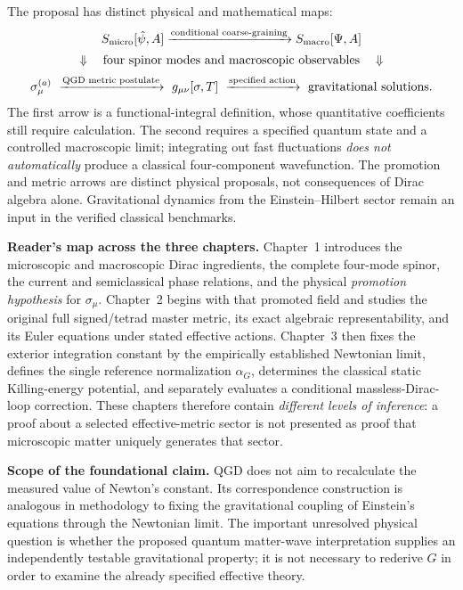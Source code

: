 \documentclass[11pt,a4paper]{article}
\begin{document}
The proposal has distinct physical and mathematical maps:
\begin{equation}\label{eq:three-maps}
\begin{gathered}
 S_{\rm micro}[\hat\psi,A]
 \xrightarrow{\text{conditional coarse-graining}}
 S_{\rm macro}[\Psi,A]\\[2pt]
 \Downarrow\quad\text{four spinor modes and macroscopic observables}\quad\Downarrow\\[2pt]
 \sigma^{(a)}_\mu\ \xrightarrow{\text{QGD metric postulate}}\
 g_{\mu\nu}[\sigma,T]\ \xrightarrow{\text{specified action}}\
 \text{gravitational solutions}.
\end{gathered}
\end{equation}
The first arrow is a functional-integral definition, whose quantitative coefficients still require calculation. The second requires a specified quantum state and a controlled macroscopic limit; integrating out fast fluctuations \emph{does not automatically} produce a classical four-component wavefunction. The promotion and metric arrows are distinct physical proposals, not consequences of Dirac algebra alone. Gravitational dynamics from the Einstein--Hilbert sector remain an input in the verified classical benchmarks.


\noindent\textbf{Reader's map across the three chapters.}
Chapter~1 introduces the microscopic and macroscopic Dirac ingredients, the complete four-mode spinor, the current and semiclassical phase relations, and the physical \emph{promotion hypothesis} for $\sigma_\mu$. Chapter~2 begins with that promoted field and studies the original full signed/tetrad master metric, its exact algebraic representability, and its Euler equations under stated effective actions. Chapter~3 then fixes the exterior integration constant by the empirically established Newtonian limit, defines the single reference normalization $\alpha_G$, determines the classical static Killing-energy potential, and separately evaluates a conditional massless-Dirac-loop correction. These chapters therefore contain \emph{different levels of inference}: a proof about a selected effective-metric sector is not presented as proof that microscopic matter uniquely generates that sector.

\noindent\textbf{Scope of the foundational claim.} QGD does not aim to recalculate the measured value of Newton's constant. Its correspondence construction is analogous in methodology to fixing the gravitational coupling of Einstein's equations through the Newtonian limit. The important unresolved physical question is whether the proposed quantum matter-wave interpretation supplies an independently testable gravitational property; it is not necessary to rederive $G$ in order to examine the already specified effective theory.
\end{document}
